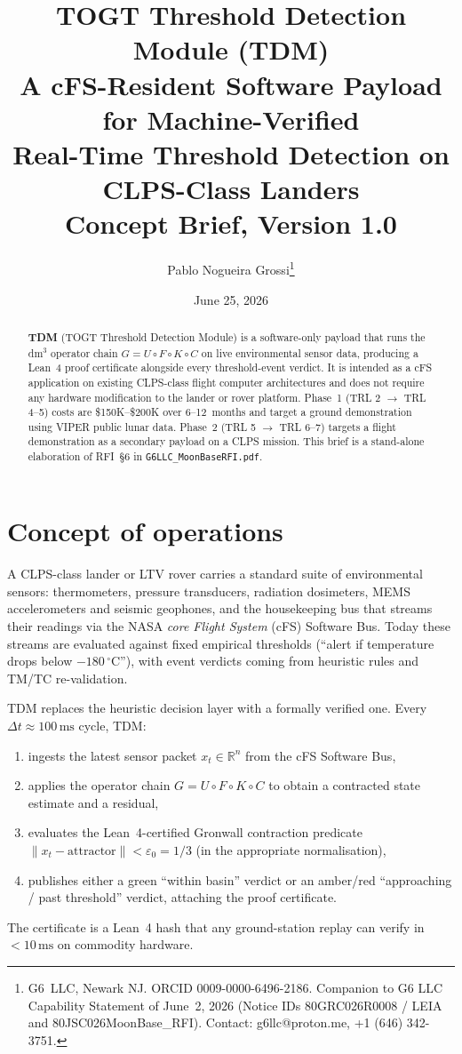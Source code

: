 \documentclass[11pt,a4paper]{article}
\title{\vspace{-1em}\textbf{TOGT Threshold Detection Module (TDM)}\\[0.2em]
\large A cFS-Resident Software Payload for Machine-Verified\\
Real-Time Threshold Detection on CLPS-Class Landers\\[0.5em]
\normalsize Concept Brief, Version 1.0}
\author{Pablo Nogueira Grossi\thanks{G6~LLC, Newark NJ.
ORCID 0009-0000-6496-2186.
Companion to G6 LLC Capability Statement of June~2, 2026
(Notice IDs 80GRC026R0008 / LEIA and 80JSC026MoonBase\_RFI).
Contact: g6llc@proton.me, +1 (646) 342-3751.}}
\date{June 25, 2026}
\newcommand{\R}{\mathbb{R}}
\begin{document}
\maketitle

\begin{abstract}\noindent
\textbf{TDM} (TOGT Threshold Detection Module) is a software-only payload
that runs the dm$^{3}$ operator chain $G = U \circ F \circ K \circ C$ on live
environmental sensor data, producing a Lean~4 proof certificate alongside
every threshold-event verdict.  It is intended as a cFS application on
existing CLPS-class flight computer architectures and does not require any
hardware modification to the lander or rover platform.  Phase~1 (TRL 2 $\to$
TRL 4--5) costs are \$150K--\$200K over 6--12~months and target a ground
demonstration using VIPER public lunar data.  Phase~2 (TRL 5 $\to$ TRL 6--7)
targets a flight demonstration as a secondary payload on a CLPS mission.
This brief is a stand-alone elaboration of RFI~\S6 in
\texttt{G6LLC\_MoonBaseRFI.pdf}.
\end{abstract}

\section{Concept of operations}

A CLPS-class lander or LTV rover carries a standard suite of environmental
sensors: thermometers, pressure transducers, radiation dosimeters, MEMS
accelerometers and seismic geophones, and the housekeeping bus that streams
their readings via the NASA \emph{core Flight System} (cFS) Software Bus.
Today these streams are evaluated against fixed empirical thresholds
(``alert if temperature drops below $-180\,^{\circ}\mathrm{C}$''), with
event verdicts coming from heuristic rules and TM/TC re-validation.

TDM replaces the heuristic decision layer with a formally verified one.
Every $\Delta t \approx 100\,\mathrm{ms}$ cycle, TDM:
\begin{enumerate}
  \item ingests the latest sensor packet $x_{t} \in \R^{n}$ from the cFS
    Software Bus,
  \item applies the operator chain $G = U \circ F \circ K \circ C$ to obtain a
    contracted state estimate and a residual,
  \item evaluates the Lean~4-certified Gronwall contraction predicate
    $\|x_{t} - \mathrm{attractor}\| < \varepsilon_{0} = 1/3$ (in the
    appropriate normalisation),
  \item publishes either a green ``within basin'' verdict or an amber/red
    ``approaching / past threshold'' verdict, attaching the proof certificate.
\end{enumerate}
The certificate is a Lean~4 hash that any ground-station replay can verify
in $<10\,\mathrm{ms}$ on commodity hardware.
\end{document}
